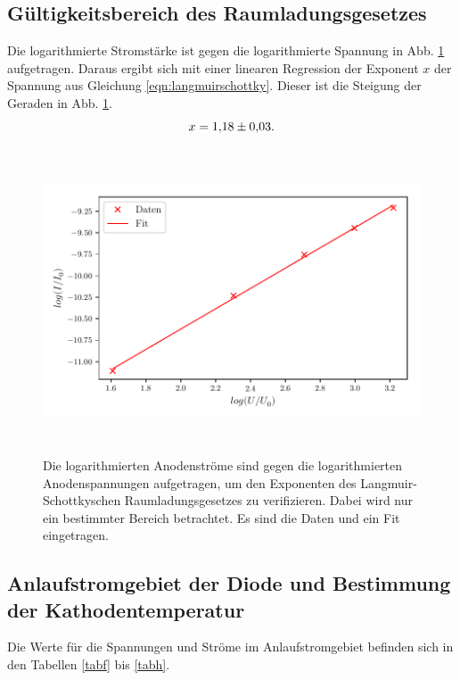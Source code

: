 \subsection{Gültigkeitsbereich des Raumladungsgesetzes}
Die logarithmierte Stromstärke ist gegen die logarithmierte
Spannung in Abb. \ref{fig:plot2} aufgetragen. %
Daraus ergibt sich mit einer linearen Regression der
Exponent $x$ der Spannung aus Gleichung \eqref{eqn:langmuirschottky}.
Dieser ist die Steigung der Geraden in Abb. \ref{fig:plot2}.
\begin{equation*}
    x = \num{1.18 \pm 0.03}.
\end{equation*}

\begin{figure}
    \centering
    \includegraphics[width=15cm, height=9cm]{build/plot2.pdf}
    \caption{Die logarithmierten Anodenströme sind gegen die logarithmierten
    Anodenspannungen aufgetragen, um den Exponenten des Langmuir-Schottkyschen
    Raumladungsgesetzes zu verifizieren. Dabei wird nur ein bestimmter
    Bereich betrachtet. Es sind die Daten und ein Fit eingetragen.}
    \label{fig:plot2}
\end{figure}


\subsection{Anlaufstromgebiet der Diode und Bestimmung der Kathodentemperatur}
Die Werte für die Spannungen und Ströme im Anlaufstromgebiet
befinden sich in den Tabellen \ref{tabf} bis \ref{tabh}.





